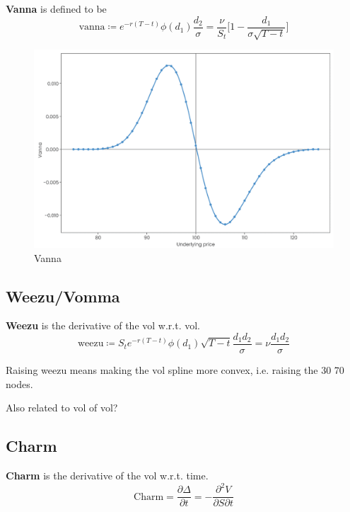 \documentclass{article}
\begin{document}
    \begin{definition}[Vanna]
      \textbf{Vanna} is defined to be 
      \begin{equation}
        \text{vanna} \coloneqq e^{-r (T - t)} \phi(d_1) \frac{d_2}{\sigma} = \frac{\nu}{S_t} \bigg[ 1 - \frac{d_1}{\sigma \sqrt{T - t}} \bigg]
      \end{equation}

      \begin{figure}[H]
        \centering 
        \includegraphics[scale=0.4]{img/vanna.png}
        \caption{Vanna} 
        \label{fig:vanna}
      \end{figure}
    \end{definition}

  \subsection{Weezu/Vomma}

    \begin{definition}
      \textbf{Weezu} is the derivative of the vol w.r.t. vol. 
      \begin{equation}
        \text{weezu} \coloneqq S_t e^{-r (T - t)} \phi(d_1) \sqrt{T - t} \frac{d_1 d_2}{\sigma} = \nu \frac{d_1 d_2}{\sigma}
      \end{equation}
    \end{definition}

    Raising weezu means making the vol spline more convex, i.e. raising the 30 70 nodes. 

    Also related to vol of vol? 

  \subsection{Charm}

    \begin{definition}[Charm]
      \textbf{Charm} is the derivative of the vol w.r.t. time. 
      \begin{equation}
        \text{Charm} = \frac{\partial \Delta}{\partial t} = -\frac{\partial^2 V}{\partial S \partial t} 
      \end{equation}
    \end{definition}
\end{document}
